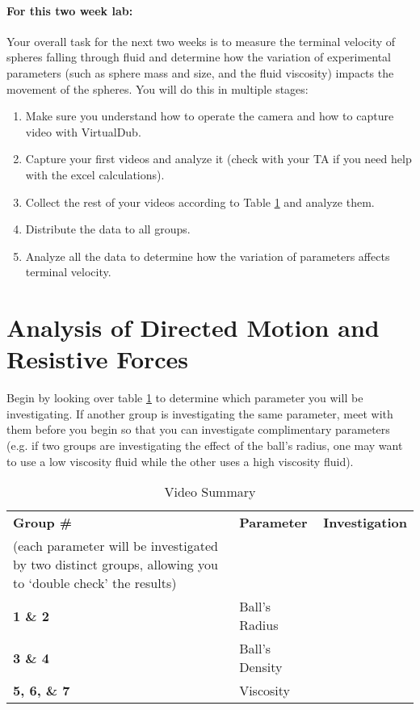 \paragraph{For this two week lab:} Your overall task for the next two weeks is to measure the terminal velocity of spheres falling through fluid and determine how the variation of experimental parameters (such as sphere mass and size, and the fluid viscosity) impacts the movement of the spheres.
You will do this in multiple stages:
\begin{enumerate}
\item Make sure you understand how to operate the camera and how to capture video with VirtualDub.
\item Capture your first videos and analyze it (check with your TA if you need help with the excel calculations).
\item Collect the rest of your videos according to Table \ref{tab:exp2video} and analyze them.
\item Distribute the data to all groups.
\item Analyze all the data to determine how the variation of parameters affects terminal velocity.
\end{enumerate}

\section{Analysis of Directed Motion and Resistive Forces}
Begin by looking over table \ref{tab:exp2video} to determine which parameter you will be investigating.
If another group is investigating the same parameter, meet with them before you begin so that you can investigate complimentary parameters (e.g. if two groups are investigating the effect of the ball's radius, one may want to use a low viscosity fluid while the other uses a high viscosity fluid).

\begin{table}[ht]
\centering
\begin{tabular}{|p{5cm}|p{3cm}|p{7cm}|}
\hline
 \textbf{Group \#} & \textbf{Parameter} & \textbf{Investigation} \\
 (each parameter will be investigated by two distinct groups, allowing you to `double check' the results) &  &  \\ \hline
 \textbf{1 \& 2} & Ball's Radius &  \\ \hline
 \textbf{3 \& 4} & Ball's Density &  \\ \hline
 \textbf{5, 6, \& 7} & Viscosity &  \\ \hline
\end{tabular}
\caption{Video Summary}
\label{tab:exp2video}
\end{table}

